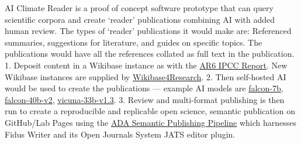 \documentclass[
  letterpaper,
  DIV=11,
  numbers=noendperiod]{scrreprt}
\begin{document}
AI Climate Reader is a proof of concept software prototype that can
query scientific corpora and create `reader' publications combining AI
with added human review. The types of `reader' publications it would
make are: Referenced summaries, suggestions for literature, and guides
on specific topics. The publications would have all the references
collated as full text in the publication. 1. Deposit content in a
Wikibase instance as with the
\href{https://semanticclimate.org/IPCC-Queries/}{AR6 IPCC Report}. New
Wikibase instances are supplied by
\href{https://nfdi4culture.de/services/details/wikibase4research.html}{Wikibase4Research}.
2. Then self-hosted AI would be used to create the publications ---
example AI models are
\href{https://huggingface.co/h2oai/h2ogpt-gm-oasst1-en-2048-falcon-7b-v3}{falcon-7b},
\href{https://huggingface.co/h2oai/h2ogpt-gm-oasst1-en-2048-falcon-40b-v2}{falcon-40b-v2},
\href{https://huggingface.co/lmsys/vicuna-33b-v1.3}{vicuna-33b-v1.3}. 3.
Review and multi-format publishing is then run to create a reproducible
and replicable open science, semantic publication on GitHub/Lab Pages
using the \href{https://github.com/TIBHannover/ADA}{ADA Semantic
Publishing Pipeline} which harnesses Fidus Writer and its Open Journals
System JATS editor plugin.
\end{document}
